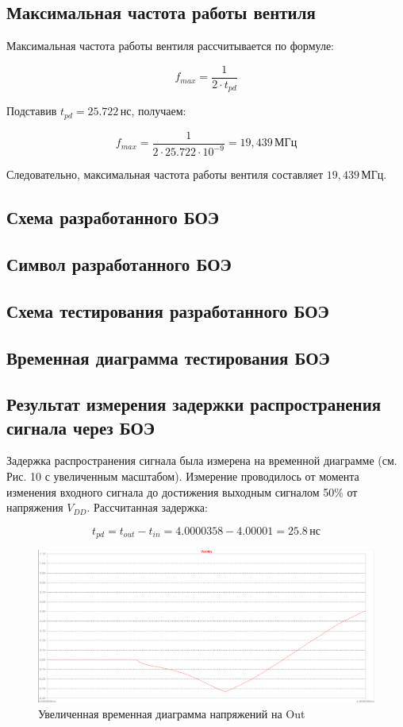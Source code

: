 \subsection{Максимальная частота работы вентиля}
Максимальная частота работы вентиля рассчитывается по формуле:

\[
	f_{max} = \frac{1}{2 \cdot t_{pd}}
\]

Подставив \( t_{pd} = 25.722 \, \text{нс} \), получаем:

\[
	f_{max} = \frac{1}{2 \cdot 25.722 \cdot 10^{-9}} = 19,439 \, \text{МГц}
\]

Следовательно, максимальная частота работы вентиля составляет \( 19,439 \, \text{МГц} \).

\subsection{Схема разработанного БОЭ}


\subsection{Символ разработанного БОЭ}


\subsection{Схема тестирования разработанного БОЭ}


\subsection{Временная диаграмма тестирования БОЭ}


\subsection{Результат измерения задержки распространения сигнала через БОЭ}
Задержка распространения сигнала была измерена на временной диаграмме (см. Рис. 10 с увеличенным масштабом). Измерение проводилось от момента изменения входного сигнала до достижения выходным сигналом 50\% от напряжения \( V_{DD} \). Рассчитанная задержка:

\[
	t_{pd} = t_{out} - t_{in} = 4.0000358 - 4.00001 = 25.8 \, \text{нс}
\]

\begin{figure}[H]
	\centering
	\includegraphics[width=1\textwidth]{../data/test_boe_time_zoomed}
	\caption{Увеличенная временная диаграмма напряжений на Out}
\end{figure}


